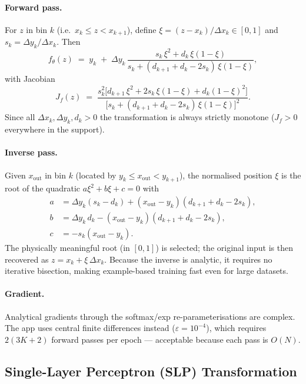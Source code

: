 \documentclass[11pt,a4paper]{article}
\newcommand{\ft}{f_{\!\theta}}
\newcommand{\Jf}{J_{\!f}}
\begin{document}
\paragraph{Forward pass.}
For $z$ in bin $k$ (i.e.\ $x_k \le z < x_{k+1}$), define
$\xi = (z - x_k)/\Delta x_k \in [0,1]$ and
$s_k = \Delta y_k / \Delta x_k$.  Then
\begin{equation}
  \ft(z) \;=\; y_k
  \;+\; \Delta y_k\,\frac{s_k\,\xi^2 + d_k\,\xi(1-\xi)}
                        {s_k + (d_{k+1}+d_k-2s_k)\,\xi(1-\xi)},
  \label{eq:rqs_fwd}
\end{equation}
with Jacobian
\begin{equation}
  \Jf(z) \;=\;
  \frac{s_k^2\bigl[d_{k+1}\,\xi^2 + 2s_k\,\xi(1-\xi) + d_k(1-\xi)^2\bigr]}
       {\bigl[s_k + (d_{k+1}+d_k-2s_k)\,\xi(1-\xi)\bigr]^2}.
  \label{eq:rqs_jac}
\end{equation}
Since all $\Delta x_k, \Delta y_k, d_k > 0$ the transformation is always
strictly monotone ($\Jf > 0$ everywhere in the support).

\paragraph{Inverse pass.}
Given $x_\mathrm{out}$ in bin $k$ (located by $y_k \le x_\mathrm{out} < y_{k+1}$),
the normalised position $\xi$ is the root of the quadratic
$a\xi^2 + b\xi + c = 0$ with
\begin{align}
  a &= \Delta y_k(s_k - d_k) + (x_\mathrm{out}-y_k)(d_{k+1}+d_k-2s_k),\\
  b &= \Delta y_k\,d_k - (x_\mathrm{out}-y_k)(d_{k+1}+d_k-2s_k),\\
  c &= -s_k(x_\mathrm{out}-y_k).
\end{align}
The physically meaningful root (in $[0,1]$) is selected; the original
input is then recovered as $z = x_k + \xi\,\Delta x_k$.  Because the
inverse is analytic, it requires no iterative bisection, making
example-based training fast even for large datasets.

\paragraph{Gradient.}
Analytical gradients through the softmax/exp re-parameterisations are
complex.  The app uses central finite differences instead
($\varepsilon = 10^{-4}$), which requires $2(3K{+}2)$ forward passes
per epoch — acceptable because each pass is $O(N)$.

\subsection{Single-Layer Perceptron (SLP) Transformation}
\end{document}
